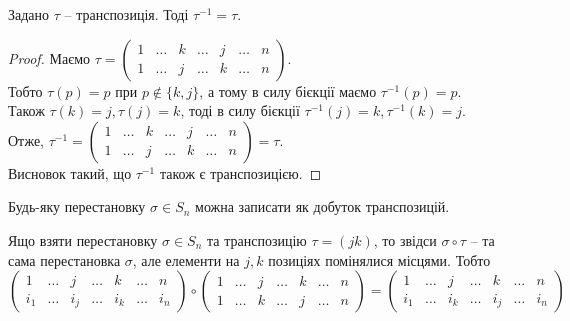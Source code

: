 \documentclass{math_library}
\begin{document}
\begin{lemma}
Задано $\tau$ -- транспозиція. Тоді $\tau^{-1} = \tau$.
\end{lemma}

\begin{proof}
Маємо $\tau = \begin{pmatrix}
1 & \dots & k & \dots & j & \dots & n \\
1 & \dots & j & \dots & k & \dots & n
\end{pmatrix}$.\\
Тобто $\tau(p) = p$ при $p \not\in \{k,j\}$, а тому в силу бієкції маємо $\tau^{-1}(p) = p$.\\
Також $\tau(k) = j, \tau(j) = k$, тоді в силу бієкції $\tau^{-1}(j) = k, \tau^{-1}(k) = j$.\\
Отже, $\tau^{-1} = \begin{pmatrix}
1 & \dots & k & \dots & j & \dots & n \\
1 & \dots & j & \dots & k & \dots & n
\end{pmatrix} = \tau$. \\
Висновок такий, що $\tau^{-1}$ також є транспозицією.
\end{proof}

\begin{theorem}
Будь-яку перестановку $\sigma \in S_n$ можна записати як добуток транспозицій.
\end{theorem}

\begin{remark}
Ящо взяти перестановку $\sigma \in S_n$ та транспозицію $\tau = (jk)$, то звідси $\sigma \circ \tau$ -- та сама перестановка $\sigma$, але елементи на $j,k$ позиціях помінялися місцями. Тобто\\
$\begin{pmatrix}
1 & \dots & j & \dots & k & \dots & n \\
i_1 & \dots & i_j & \dots & i_k & \dots & i_n
\end{pmatrix} \circ \begin{pmatrix}
1 & \dots & j & \dots & k & \dots & n \\
1 & \dots & k & \dots & j & \dots & n
\end{pmatrix} = \begin{pmatrix}
1 & \dots & j & \dots & k & \dots & n \\
i_1 & \dots & i_k & \dots & i_j & \dots & i_n
\end{pmatrix}$
\end{remark}
\end{document}
